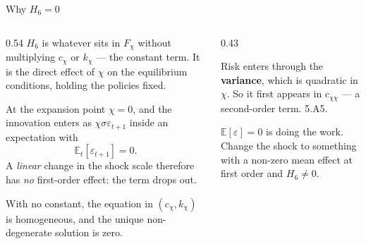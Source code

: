 \begin{frame}{Why $H_6=0$}
\begin{columns}[T]
\begin{column}{0.54\textwidth}
\small
$H_6$ is whatever sits in $F_\chi$ without multiplying $c_\chi$ or $k_\chi$ --- the constant term. It is the direct effect of $\chi$ on the equilibrium conditions, holding the policies fixed.
\medskip

At the expansion point $\chi=0$, and the innovation enters as $\chi\sigma\varepsilon_{t+1}$ inside an expectation with
\[
  \mathbb{E}_t[\varepsilon_{t+1}]=0 .
\]
A \emph{linear} change in the shock scale therefore has \emph{no} first-order effect: the term drops out.
\medskip

With no constant, the equation in $(c_\chi,k_\chi)$ is homogeneous, and the unique non-degenerate solution is zero.
\end{column}
\begin{column}{0.43\textwidth}
\begin{conceptbox}[title=\textbf{Where risk survives}]\small
Risk enters through the \textbf{variance}, which is quadratic in $\chi$. So it first appears in $c_{\chi\chi}$ --- a second-order term. 5.A5.
\end{conceptbox}
\medskip
\begin{cautionbox}\footnotesize
$\mathbb{E}[\varepsilon]=0$ is doing the work. Change the shock to something with a non-zero mean effect at first order and $H_6\neq0$.
\end{cautionbox}
\end{column}
\end{columns}
\vspace{1mm}
\end{frame}

